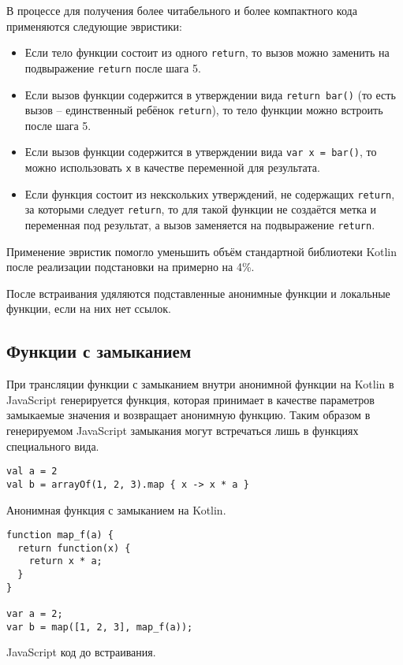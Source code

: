 В процессе для получения более читабельного и более компактного кода применяются
следующие эвристики:
\begin{itemize}
  \item Если тело функции состоит из одного \texttt{return},
  то вызов можно заменить на подвыражение \texttt{return} после шага 5.
  \item Если вызов функции содержится в утверждении вида \texttt{return bar()}
  (то есть вызов -- единственный ребёнок \texttt{return}), то
  тело функции можно встроить после шага 5.
  \item Если вызов функции содержится в утверждении вида \texttt{var x = bar()},
  то можно использовать \texttt{x} в качестве переменной для результата.
  \item Если функция состоит из некскольких утверждений, не содержащих
  \texttt{return}, за которыми следует \texttt{return}, то для такой функции
  не создаётся метка и переменная под результат, а
  вызов заменяется на подвыражение \texttt{return}.
\end{itemize}

Применение эвристик помогло уменьшить объём стандартной библиотеки
Kotlin после реализации подстановки на примерно на 4\%.

После встраивания удяляются подставленные анонимные функции
и локальные функции, если на них нет ссылок.

\subsection{Функции с замыканием}

При трансляции функции с замыканием внутри анонимной
функции на Kotlin в JavaScript
генерируется функция, которая принимает в качестве
параметров замыкаемые значения и возвращает анонимную функцию.
Таким образом в генерируемом JavaScript замыкания могут встречаться
лишь в функциях специального вида.

\begin{listing}[H]
\begin{verbatim}
val a = 2
val b = arrayOf(1, 2, 3).map { x -> x * a }
\end{verbatim}
\caption{Анонимная функция с замыканием на Kotlin.}
\end{listing}

\begin{listing}[H]
\begin{verbatim}
function map_f(a) {
  return function(x) {
    return x * a;
  }
}

var a = 2;
var b = map([1, 2, 3], map_f(a));
\end{verbatim}
\caption{JavaScript код до встраивания.}
\end{listing}

